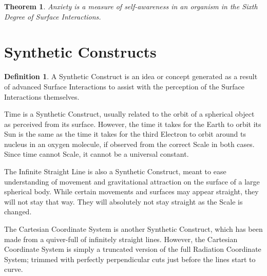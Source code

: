 \documentclass[12pt]{article}
\theoremstyle{plain}
\newtheorem{theorem}{Theorem}
\theoremstyle{definition}
\newtheorem{definition}{Definition}
\begin{document}
\begin{theorem}
Anxiety is a measure of self-awareness in an organism in the Sixth Degree of Surface Interactions.
\end{theorem}

\section*{Synthetic Constructs}

\begin{definition}
A Synthetic Construct is an idea or concept generated as a result of advanced Surface Interactions to assist with the perception of the Surface Interactions themselves.
\end{definition}

Time is a Synthetic Construct, usually related to the orbit of a spherical object as perceived from its surface. However, the time it takes for the Earth to orbit its Sun is the same as the time it takes for the third Electron to orbit around ts nucleus in an oxygen molecule, if observed from the correct Scale in both cases. Since time cannot Scale, it cannot be a universal constant.

The Infinite Straight Line is also a Synthetic Construct, meant to ease understanding of movement and gravitational attraction on the surface of a large spherical body. While certain movements and surfaces may appear straight, they will not stay that way. They will absolutely not stay straight as the Scale is changed.

The Cartesian Coordinate System is another Synthetic Construct, which has been made from a quiver-full of infinitely straight lines. However, the Cartesian Coordinate System is simply a truncated version of the full Radiation Coordinate System; trimmed with perfectly perpendicular cuts just before the lines start to curve.
\end{document}
